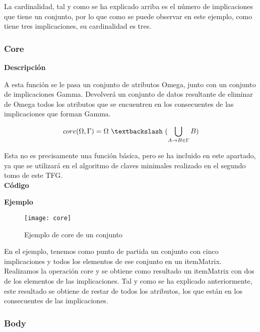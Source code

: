     La cardinalidad, tal y como se ha explicado arriba es el n\'umero de implicaciones que tiene un conjunto, por lo que como 
    se puede observar en este ejemplo, como tiene tres implicaciones, su cardinalidad es tres.



\subsubsection{Core}

    \textbf{Descripci\'on}

    A esta funci\'on se le pasa un conjunto de atributos Omega, junto con un conjunto de implicaciones Gamma. 
    Devolver\'a un conjunto de datos resultante de eliminar de Omega todos los atributos que se encuentren en los 
    consecuentes de las implicaciones que forman Gamma. 

    \[
        core(\Omega , \Gamma ) = \Omega ~ \textbackslash ~ ( \bigcup_{A \to B \in \Gamma} B )    
    \]
    
    Esta no es precisamente una funci\'on b\'asica, pero se ha incluido en este apartado, ya que se utilizar\'a 
    en el algoritmo de claves minimales realizado en el segundo tomo de este TFG.
    \\


    \textbf{C\'odigo}

    
    \bigskip

    \textbf{Ejemplo}


    \begin{figure}[H]
        \centering
        \texttt{[image: core]}
        \caption{Ejemplo de core de un conjunto}
        \label{fig:core}
    \end{figure}

    En el ejemplo, tenemos como punto de partida un conjunto con cinco implicaciones y todos los elementos de ese conjunto en 
    un itemMatrix. Realizamos la operaci\'on core y se obtiene como resultado un itemMatrix con dos de los elementos de las implicaciones. 
    Tal y como se ha explicado anteriormente, este resultado se obtiene de restar de todos los atributos, los que est\'an en los consecuentes 
    de las implicaciones.



\subsubsection{Body}

